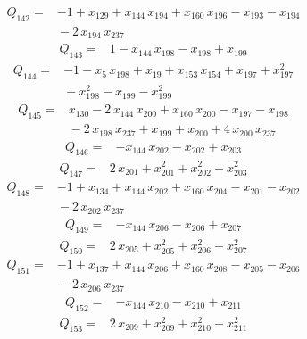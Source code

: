 \documentclass[11pt]{article}
\theoremstyle{definition}\newtheorem{definition}[theorem]{Definition}
\begin{document}
\begin{align*}
Q_{142}={}&-1+x_{129}+x_{144}\,x_{194}+x_{160}\,x_{196}-x_{193}-x_{194}
\\ &{}-2\,x_{194}\,x_{237}
\end{align*}
\begin{align*}
Q_{143}={}&1-x_{144}\,x_{198}-x_{198}+x_{199}
\end{align*}
\begin{align*}
Q_{144}={}&-1-x_{5}\,x_{198}+x_{19}+x_{153}\,x_{154}+x_{197}+x_{197}^{2}
\\ &{}+x_{198}^{2}-x_{199}-x_{199}^{2}
\end{align*}
\begin{align*}
Q_{145}={}&x_{130}-2\,x_{144}\,x_{200}+x_{160}\,x_{200}-x_{197}-x_{198}
\\ &{}-2\,x_{198}\,x_{237}+x_{199}+x_{200}+4\,x_{200}\,x_{237}
\end{align*}
\begin{align*}
Q_{146}={}&-x_{144}\,x_{202}-x_{202}+x_{203}
\end{align*}
\begin{align*}
Q_{147}={}&2\,x_{201}+x_{201}^{2}+x_{202}^{2}-x_{203}^{2}
\end{align*}
\begin{align*}
Q_{148}={}&-1+x_{134}+x_{144}\,x_{202}+x_{160}\,x_{204}-x_{201}-x_{202}
\\ &{}-2\,x_{202}\,x_{237}
\end{align*}
\begin{align*}
Q_{149}={}&-x_{144}\,x_{206}-x_{206}+x_{207}
\end{align*}
\begin{align*}
Q_{150}={}&2\,x_{205}+x_{205}^{2}+x_{206}^{2}-x_{207}^{2}
\end{align*}
\begin{align*}
Q_{151}={}&-1+x_{137}+x_{144}\,x_{206}+x_{160}\,x_{208}-x_{205}-x_{206}
\\ &{}-2\,x_{206}\,x_{237}
\end{align*}
\begin{align*}
Q_{152}={}&-x_{144}\,x_{210}-x_{210}+x_{211}
\end{align*}
\begin{align*}
Q_{153}={}&2\,x_{209}+x_{209}^{2}+x_{210}^{2}-x_{211}^{2}
\end{align*}
\end{document}

